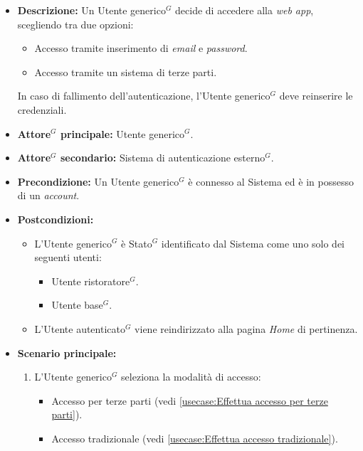 \label{usecase:Effettua accesso}

\begin{itemize}
	\item \textbf{Descrizione:} Un \gls{Utente generico}$^G$ decide di accedere alla \textit{web app}, scegliendo tra due opzioni:
	\begin{itemize}
		\item Accesso tramite inserimento di \textit{email} e \textit{password}.
		\item Accesso tramite un sistema di terze parti.
	\end{itemize}
	In caso di fallimento dell'autenticazione, l'\gls{Utente generico}$^G$ deve reinserire le credenziali.

	\item \textbf{\gls{Attore}$^G$ principale:} \gls{Utente generico}$^G$.
	\item \textbf{\gls{Attore}$^G$ secondario:} Sistema di autenticazione esterno$^G$.
	\item \textbf{Precondizione:}
	      Un \gls{Utente generico}$^G$ è connesso al Sistema ed è in possesso di un \textit{account}.

	\item \textbf{Postcondizioni:}
		\begin{itemize}      
			\item L'\gls{Utente generico}$^G$ è \gls{Stato}$^G$ identificato dal Sistema come uno solo dei seguenti utenti:
	      		\begin{itemize}
		      		\item \gls{Utente ristoratore}$^G$.
		      		\item \gls{Utente base}$^G$.
	      		\end{itemize}
		  	\item L'\gls{Utente autenticato}$^G$ viene reindirizzato alla pagina \textit{Home} di pertinenza.
		\end{itemize}

	\item \textbf{Scenario principale:}
	      \begin{enumerate}
		      \item L'\gls{Utente generico}$^G$ seleziona la modalità di accesso: 

			  \begin{itemize}
				\item Accesso per terze parti (vedi \autoref{usecase:Effettua accesso per terze parti}).
				\item Accesso tradizionale (vedi \autoref{usecase:Effettua accesso tradizionale}).
			  \end{itemize}


\end{enumerate}
\end{itemize}
